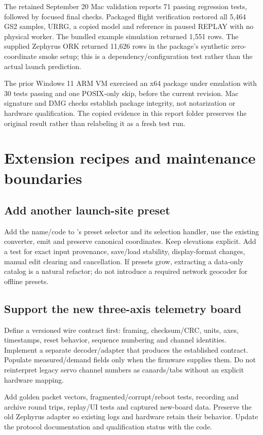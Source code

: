 The retained September 20 Mac validation reports 71 passing regression tests,
followed by focused final checks. Packaged flight verification restored all
5,464 GS2 samples, URRG, a copied model and reference in paused REPLAY with no
physical worker. The bundled example simulation returned 1,551 rows.
The supplied Zephyrus ORK returned 11,626 rows in the package's synthetic
zero-coordinate smoke setup; this is a dependency/configuration test rather
than the actual launch prediction.

The prior Windows 11 ARM VM exercised an x64 package under emulation with
30 tests passing and one POSIX-only skip, before the current revision.
Mac signature and DMG checks establish package integrity, not notarization or
hardware qualification. The copied evidence in this report folder preserves
the original result rather than relabeling it as a fresh test run.

\section{Extension recipes and maintenance boundaries}\label{sec:extend}
\subsection{Add another launch-site preset}
Add the name/code to 's preset selector and its selection
handler, use the existing converter, emit  and preserve
canonical coordinates. Keep elevations explicit. Add a test for exact input
provenance, save/load stability, display-format changes, manual edit clearing
and cancellation. If presets grow, extracting a data-only catalog is a natural
refactor; do not introduce a required network geocoder for offline presets.

\subsection{Support the new three-axis telemetry board}
Define a versioned wire contract first: framing, checksum/CRC, units, axes,
timestamps, reset behavior, sequence numbering and channel identities. Implement
a separate decoder/adapter that produces the established  contract.
Populate measured/demand fields only when the firmware supplies them.
Do not reinterpret legacy servo channel numbers as canards/tabs without an
explicit hardware mapping.

Add golden packet vectors, fragmented/corrupt/reboot tests, recording and archive
round trips, replay/UI tests and captured new-board data. Preserve the old
Zephyrus adapter so existing logs and hardware retain their behavior. Update the
protocol documentation and qualification status with the code.

